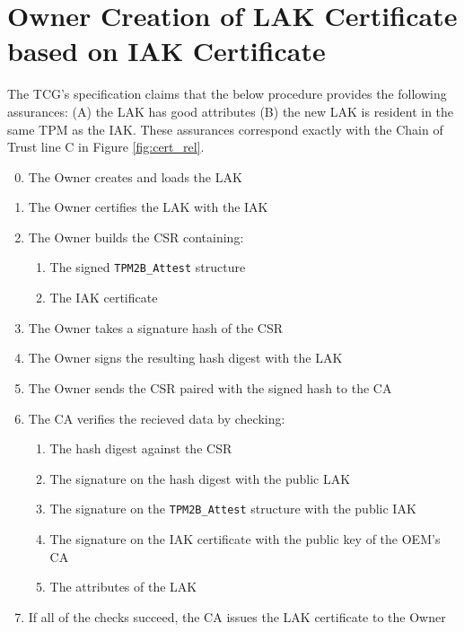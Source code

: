 \section{Owner Creation of LAK Certificate based on IAK Certificate}

The TCG's specification claims that the below procedure provides the following assurances: (A) the LAK has good attributes (B) the new LAK is resident in the same TPM as the IAK. These assurances correspond exactly with the Chain of Trust line C in Figure \ref{fig:cert_rel}.
\begin{enumerate}[itemsep=0pt,parsep=0pt,partopsep=0pt]
  \setcounter{enumi}{-1}
  \item The Owner creates and loads the LAK
  \item The Owner certifies the LAK with the IAK
  \item The Owner builds the CSR containing:
  \begin{enumerate}[topsep=0pt, itemsep=0pt,parsep=0pt,partopsep=0pt]
    \item The signed \verb|TPM2B_Attest| structure
    \item The IAK certificate
  \end{enumerate}
  \item The Owner takes a signature hash of the CSR
  \item The Owner signs the resulting hash digest with the LAK
  \item The Owner sends the CSR paired with the signed hash to the CA
  \item The CA verifies the recieved data by checking:
  \begin{enumerate}[topsep=0pt, itemsep=0pt,parsep=0pt,partopsep=0pt]
    \item The hash digest against the CSR
    \item The signature on the hash digest with the public LAK
    \item The signature on the \verb|TPM2B_Attest| structure with the public IAK
    \item The signature on the IAK certificate with the public key of the OEM's CA
    \item The attributes of the LAK
  \end{enumerate}
  \item If all of the checks succeed, the CA issues the LAK certificate to the Owner
\end{enumerate}



